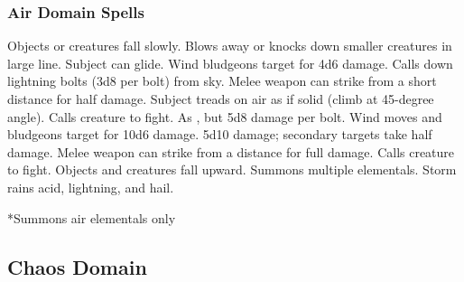 \subsubsection{Air Domain Spells}
\begin{spelllist}
   Objects or creatures fall slowly.
   Blows away or knocks down smaller creatures in large line.
   Subject can glide.
   Wind bludgeons target for 4d6 damage.
   Calls down lightning bolts (3d8 per bolt) from sky.
   Melee weapon can strike from a short distance for half damage.
   Subject treads on air as if solid (climb at 45-degree angle).
   Calls creature to fight.
   As , but 5d8 damage per bolt.
   Wind moves and bludgeons target for 10d6 damage.
   5d10 damage; secondary targets take half damage.
   Melee weapon can strike from a distance for full damage.
  \spellhead[7]{}
   Calls creature to fight.
   Objects and creatures fall upward.
   Summons multiple elementals.
   Storm rains acid, lightning, and hail.
\end{spelllist}
*Summons air elementals only

\subsection{Chaos Domain}

